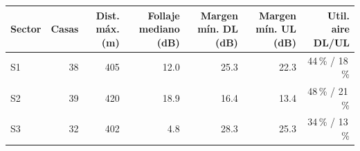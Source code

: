 \begin{tabular}{lrrrrrr}\toprule Sector & Casas & Dist. máx. (m) & Follaje mediano (dB) & Margen mín. DL (dB) & Margen mín. UL (dB) & Util. aire DL/UL\\\midrule
S1 & 38 & 405 & 12.0 & 25.3 & 22.3 & 44\,\% / 18\,\%\\
S2 & 39 & 420 & 18.9 & 16.4 & 13.4 & 48\,\% / 21\,\%\\
S3 & 32 & 402 & 4.8 & 28.3 & 25.3 & 34\,\% / 13\,\%\\\bottomrule\end{tabular}
